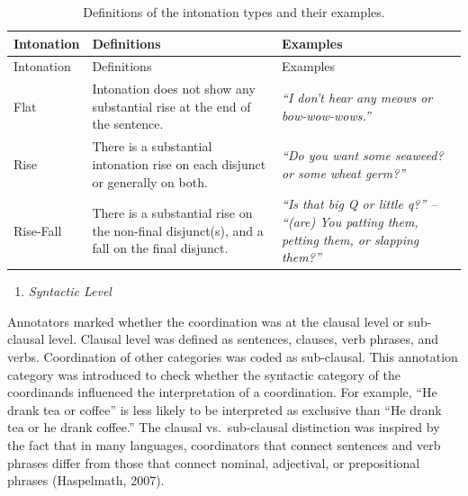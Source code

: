 \documentclass[
  english,
  ,man,floatsintext]{apa6}
\providecommand{\tightlist}{%
  \setlength{\itemsep}{0pt}\setlength{\parskip}{0pt}}
\begin{document}
\begin{longtable}[]{@{}
  >{\raggedright\arraybackslash}p{}
  >{\raggedright\arraybackslash}p{}
  >{\raggedright\arraybackslash}p{}@{}}
\caption{\label{tab:intonationTypes} Definitions of the intonation types and their examples.}\tabularnewline
\toprule
Intonation & Definitions & Examples \\
\midrule
\endfirsthead
\toprule
Intonation & Definitions & Examples \\
\midrule
\endhead
Flat & Intonation does not show any substantial rise at the end of the sentence. & \emph{``I don't hear any meows or bow-wow-wows.''} \\
Rise & There is a substantial intonation rise on each disjunct or generally on both. & \emph{``Do you want some seaweed? or some wheat germ?''} \\
Rise-Fall & There is a substantial rise on the non-final disjunct(s), and a fall on the final disjunct. & \emph{``Is that big Q or little q?'' -- ``(are) You patting them, petting them, or slapping them?''} \\
\bottomrule
\end{longtable}

\begin{enumerate}
\def\labelenumi{\arabic{enumi}.}
\setcounter{enumi}{4}
\tightlist
\item
  \emph{Syntactic Level}
\end{enumerate}

Annotators marked whether the coordination was at the clausal level or sub-clausal level. Clausal level was defined as sentences, clauses, verb phrases, and verbs. Coordination of other categories was coded as sub-clausal. This annotation category was introduced to check whether the syntactic category of the coordinands influenced the interpretation of a coordination. For example, ``He drank tea or coffee'' is less likely to be interpreted as exclusive than ``He drank tea or he drank coffee.'' The clausal vs.~sub-clausal distinction was inspired by the fact that in many languages, coordinators that connect sentences and verb phrases differ from those that connect nominal, adjectival, or prepositional phrases (Haspelmath, 2007).
\end{document}

